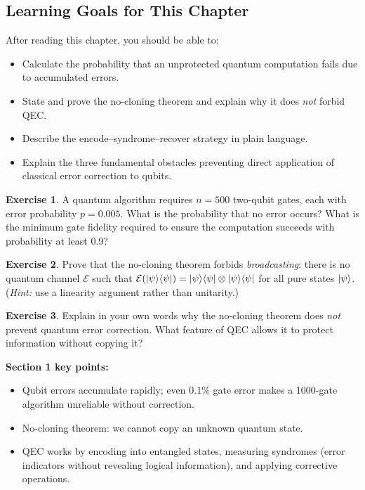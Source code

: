 \documentclass[11pt, a4paper]{article}
\theoremstyle{definition}
\newtheorem{exercise}{Exercise}[section]
\theoremstyle{plain}
\theoremstyle{remark}
\providecommand{\proj}[1]{\ket{#1}\!\bra{#1}}
\begin{document}
\subsection{Learning Goals for This Chapter}

After reading this chapter, you should be able to:
\begin{itemize}
  \item Calculate the probability that an unprotected quantum computation
        fails due to accumulated errors.
  \item State and prove the no-cloning theorem and explain why it does
        \emph{not} forbid QEC.
  \item Describe the encode--syndrome--recover strategy in plain language.
  \item Explain the three fundamental obstacles preventing direct application
        of classical error correction to qubits.
\end{itemize}

\begin{exercise}
A quantum algorithm requires $n = 500$ two-qubit gates, each with error
probability $p = 0.005$.  What is the probability that no error occurs?
What is the minimum gate fidelity required to ensure the computation
succeeds with probability at least 0.9?
\end{exercise}

\begin{exercise}
Prove that the no-cloning theorem forbids \emph{broadcasting}: there is no
quantum channel $\mathcal{E}$ such that
$\mathcal{E}(\proj{\psi}) = \proj{\psi} \otimes \proj{\psi}$ for all pure
states $\ket{\psi}$.  (\emph{Hint:} use a linearity argument rather than
unitarity.)
\end{exercise}

\begin{exercise}
Explain in your own words why the no-cloning theorem does \emph{not} prevent
quantum error correction.  What feature of QEC allows it to protect
information without copying it?
\end{exercise}

\begin{summarybox}
\textbf{Section 1 key points:}
\begin{itemize}
  \item Qubit errors accumulate rapidly; even 0.1\% gate error makes a
        1000-gate algorithm unreliable without correction.
  \item No-cloning theorem: we cannot copy an unknown quantum state.
  \item QEC works by encoding into entangled states, measuring syndromes
        (error indicators without revealing logical information), and
        applying corrective operations.
\end{itemize}
\end{summarybox}
\end{document}
